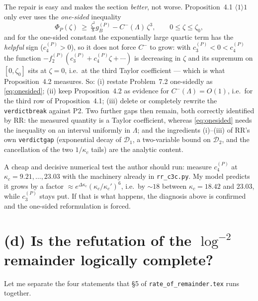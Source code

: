 \documentclass[11pt]{article}
\begin{document}
\begin{verdictgap}
The repair is easy and makes the section \emph{better}, not worse.  Proposition~4.1
$\langle1\rangle1$ only ever uses the \emph{one-sided} inequality
\begin{equation}\label{eq:onesided}
 \Phi_P(\zeta)\ \ge\ \tfrac{\zeta^2}8g_B^{(P)}-C^-(\Lambda)\,\zeta^3,\qquad 0\le\zeta\le\zeta_0 ,
\end{equation}
and for the one-sided constant the exponentially large quartic term has the \emph{helpful} sign
($c_4^{(P)}>0$), so it does not force $C^-$ to grow: with $c_3^{(P)}<0<c_4^{(P)}$ the function
$-f_2^{(P)}(c_3^{(P)}+c_4^{(P)}\zeta+\cdots)$ is decreasing in $\zeta$ and its supremum on
$[0,\zeta_0]$ sits at $\zeta=0$, i.e.\ at the third Taylor coefficient --- which is what
Proposition~4.2 measures.  So: (i) restate Problem~7.2 one-sidedly as \eqref{eq:onesided};
(ii) keep Proposition~4.2 as evidence for $C^-(\Lambda)=O(1)$, i.e.\ for the third row of
Proposition~4.1; (iii) delete or completely rewrite the \texttt{verdictbreak} against P2.  Two
further gaps then remain, both correctly identified by RR: the measured quantity is a Taylor
coefficient, whereas \eqref{eq:onesided} needs the inequality on an interval uniformly in $\Lambda$;
and the ingredients (i)--(iii) of RR's own \texttt{verdictgap} (exponential decay of
$\mathcal D_1$, a two-variable bound on $\mathcal D_2$, and the cancellation of the two
$1/\kappa_c$ tails) are the analytic content.

A cheap and decisive numerical test the author should run: measure $c_4^{(P)}$ at
$\kappa_c=9.21,\dots,23.03$ with the machinery already in \texttt{rr\_c3c.py}.  My model predicts
it grows by a factor $\approx e^{\Delta\kappa_c}(\kappa_c/\kappa_c')^6$, i.e.\ by $\sim18$ between
$\kappa_c=18.42$ and $23.03$, while $c_3^{(P)}$ stays put.  If that is what happens, the diagnosis
above is confirmed and the one-sided reformulation is forced.
\end{verdictgap}

\section{(d) Is the refutation of the $\log^{-2}$ remainder logically complete?}\label{sec:logic}

Let me separate the four statements that \S5 of \texttt{rate\_of\_remainder.tex} runs together.
\end{document}
